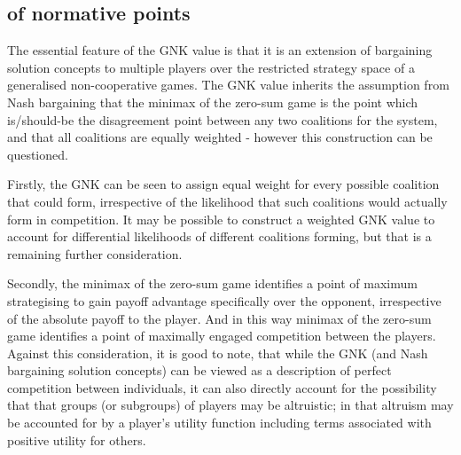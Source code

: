 \subsection{\DIFdelbegin {}\DIFdelend \DIFaddbegin {}\DIFaddend of normative points}

The essential feature of the GNK value is that it is an extension of bargaining solution concepts to multiple players over the restricted strategy space of a generalised non-cooperative games.
The GNK value inherits the assumption from Nash bargaining that the minimax of the zero-sum game is the point which is/should-be the disagreement point between any two coalitions for the system, and that all coalitions are equally weighted - however this construction can be questioned.

Firstly, the GNK can be seen to assign equal weight for every possible coalition that could form, irrespective of the likelihood that such coalitions would actually form in competition.
It may be possible to construct a weighted GNK value to account for differential likelihoods of different coalitions forming, but that is a remaining further consideration.

Secondly, the minimax of the zero-sum game identifies a point of maximum strategising to gain payoff advantage specifically over the opponent, irrespective of the absolute payoff to the player.
And in this way minimax of the zero-sum game identifies a point of maximally engaged competition between the players.
Against this consideration, it is good to note, that while the GNK (and Nash bargaining solution concepts) can be viewed as a description of perfect competition between individuals, it can also directly account for the possibility that that groups (or subgroups) of players may be altruistic; in that altruism may be accounted for by a player's utility function including terms associated with positive utility for others.

